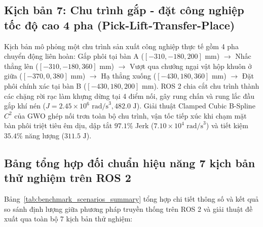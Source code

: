 \subsection{Kịch bản 7: Chu trình gắp - đặt công nghiệp tốc độ cao 4 pha (Pick-Lift-Transfer-Place)}

Kịch bản mô phỏng một chu trình sản xuất công nghiệp thực tế gồm 4 pha chuyển động liên hoàn: Gắp phôi tại bàn A ($[-310, -180, 200]\text{ mm}$) $\to$ Nhấc thẳng lên ($[-310, -180, 360]\text{ mm}$) $\to$ Vượt qua chướng ngại vật hộp khuôn ở giữa ($[-370, 0, 380]\text{ mm}$) $\to$ Hạ thẳng xuống ($[-430, 180, 360]\text{ mm}$) $\to$ Đặt phôi chính xác tại bàn B ($[-430, 180, 200]\text{ mm}$).
ROS 2 chia cắt chu trình thành các chặng rời rạc làm khựng dừng tại 4 điểm nối, gây rung chấn và rung lắc đầu gắp khí nén ($J = 2.45 \times 10^6\text{ rad/s}^3, 482.0\text{ J}$). Giải thuật Clamped Cubic B-Spline $C^2$ của GWO ghép nối trơn toàn bộ chu trình, vận tốc tiếp xúc khi chạm mặt bàn phôi triệt tiêu êm dịu, dập tắt $97.1\%$ Jerk ($7.10 \times 10^4\text{ rad/s}^3$) và tiết kiệm $35.4\%$ năng lượng ($311.5\text{ J}$).

\subsection{Bảng tổng hợp đối chuẩn hiệu năng 7 kịch bản thử nghiệm trên ROS 2}

Bảng~\ref{tab:benchmark_scenarios_summary} tổng hợp chi tiết thông số và kết quả so sánh định lượng giữa phương pháp truyền thống trên ROS 2 và giải thuật đề xuất qua toàn bộ 7 kịch bản thử nghiệm:

